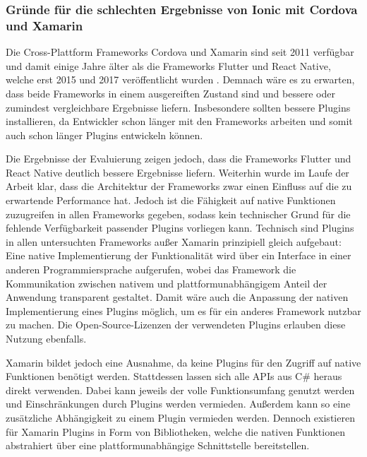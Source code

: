 \subsubsection{Gründe für die schlechten Ergebnisse von Ionic mit Cordova und Xamarin}
Die Cross-Plattform Frameworks Cordova und Xamarin sind seit 2011 verfügbar und damit einige Jahre älter als die Frameworks Flutter und React Native, welche erst 2015 und 2017 veröffentlicht wurden \cite{Steyer_Cordova,Sharma_Flutter,Xamarin_EOL,ReactNative_Release}.
Demnach wäre es zu erwarten, dass beide Frameworks in einem ausgereiften Zustand sind und bessere oder zumindest vergleichbare Ergebnisse liefern.
Insbesondere sollten bessere Plugins installieren, da Entwickler schon länger mit den Frameworks arbeiten und somit auch schon länger Plugins entwickeln können.

Die Ergebnisse der Evaluierung zeigen jedoch, dass die Frameworks Flutter und React Native deutlich bessere Ergebnisse liefern.
Weiterhin wurde im Laufe der Arbeit klar, dass die Architektur der Frameworks zwar einen Einfluss auf die zu erwartende Performance hat.
Jedoch ist die Fähigkeit auf native Funktionen zuzugreifen in allen Frameworks gegeben, sodass kein technischer Grund für die fehlende Verfügbarkeit passender Plugins vorliegen kann.
Technisch sind Plugins in allen untersuchten Frameworks außer Xamarin prinzipiell gleich aufgebaut: Eine native Implementierung der Funktionalität wird über ein Interface in einer anderen Programmiersprache aufgerufen, wobei das Framework die Kommunikation zwischen nativem und plattformunabhängigem Anteil der Anwendung transparent gestaltet.
Damit wäre auch die Anpassung der nativen Implementierung eines Plugins möglich, um es für ein anderes Framework nutzbar zu machen.
Die Open-Source-Lizenzen der verwendeten Plugins erlauben diese Nutzung ebenfalls.

Xamarin bildet jedoch eine Ausnahme, da keine Plugins für den Zugriff auf native Funktionen benötigt werden.
Stattdessen lassen sich alle \acp{API} aus C\# heraus direkt verwenden.
Dabei kann jeweils der volle Funktionsumfang genutzt werden und Einschränkungen durch Plugins werden vermieden.
Außerdem kann so eine zusätzliche Abhängigkeit zu einem Plugin vermieden werden.
Dennoch existieren für Xamarin Plugins in Form von Bibliotheken, welche die nativen Funktionen abstrahiert über eine plattformunabhängige Schnittstelle bereitstellen.


